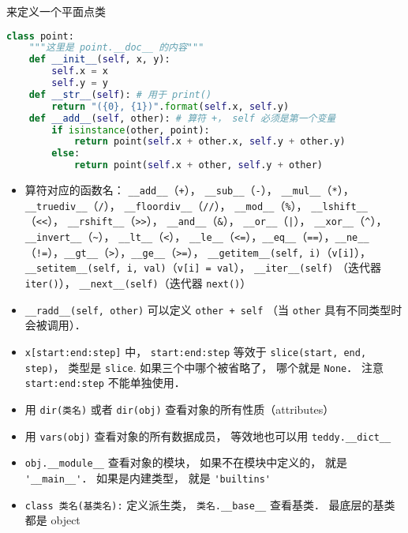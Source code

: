 来定义一个平面点类
\begin{lstlisting}[language=python]
class point:
    """这里是 point.__doc__ 的内容"""
    def __init__(self, x, y): 
        self.x = x 
        self.y = y 
    def __str__(self): # 用于 print()
        return "({0}, {1})".format(self.x, self.y)
    def __add__(self, other): # 算符 +， self 必须是第一个变量
        if isinstance(other, point):
            return point(self.x + other.x, self.y + other.y)
        else:
            return point(self.x + other, self.y + other)
\end{lstlisting}
\begin{itemize}
\item 算符对应的函数名： \verb|__add__|（\verb|+|）， \verb|__sub__|（\verb|-|）， \verb|__mul__|（\verb|*|）， \verb|__truediv__|（\verb|/|）， \verb|__floordiv__|（\verb|//|）， \verb|__mod__|（\verb|%|）， \verb|__lshift__|（\verb|<<|）， \verb|__rshift__|（\verb|>>|）， \verb|__and__|（\verb|&|）， \verb|__or__|（\verb`|`）， \verb|__xor__|（\verb|^|）， \verb|__invert__|（\verb|~|）， \verb|__lt__|（\verb|<|）， \verb|__le__|（\verb|<=|），\verb|__eq__|（\verb|==|），\verb|__ne__|（\verb|!=|），\verb|__gt__|（\verb|>|），\verb|__ge__|（\verb|>=|）， \verb|__getitem__(self, i)|（\verb|v[i]|）， \verb|__setitem__(self, i, val)|（\verb|v[i] = val|）， \verb|__iter__(self)| （迭代器 \verb|iter()|）， \verb|__next__(self)|（迭代器 \verb|next()|）
\item \verb|__radd__(self, other)| 可以定义 \verb|other + self| （当 \verb|other| 具有不同类型时会被调用）．
\item \verb|x[start:end:step]| 中， \verb|start:end:step| 等效于 \verb|slice(start, end, step)|， 类型是 \verb|slice|. 如果三个中哪个被省略了， 哪个就是 \verb|None|． 注意 \verb|start:end:step| 不能单独使用．
\item 用 \verb|dir(类名)| 或者 \verb|dir(obj)| 查看对象的所有性质（attributes）
\item 用 \verb|vars(obj)| 查看对象的所有数据成员， 等效地也可以用 \verb|teddy.__dict__|
\item \verb|obj.__module__| 查看对象的模块， 如果不在模块中定义的， 就是 \verb|'__main__'|． 如果是内建类型， 就是 \verb|'builtins'|
\item \verb|class 类名(基类名):| 定义派生类， \verb|类名.__base__| 查看基类． 最底层的基类都是 object
\end{itemize}
